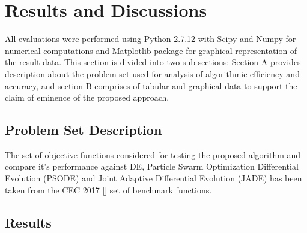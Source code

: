 \section{Results and Discussions}

All evaluations were performed using Python 2.7.12 with Scipy and Numpy for numerical computations and Matplotlib package for graphical representation of the result data. This section is divided into two sub-sections: Section A provides description about the problem set used for analysis of algorithmic efficiency and accuracy, and section B comprises of tabular and graphical data to support the claim of eminence of the proposed approach.

\subsection{Problem Set Description}

The set of objective functions considered for testing the proposed algorithm and compare it's performance against DE, Particle Swarm Optimization Differential Evolution (PSODE) and Joint Adaptive Differential Evolution (JADE) has been taken from the CEC 2017 [] set of benchmark functions.



\subsection{Results}




%

%

